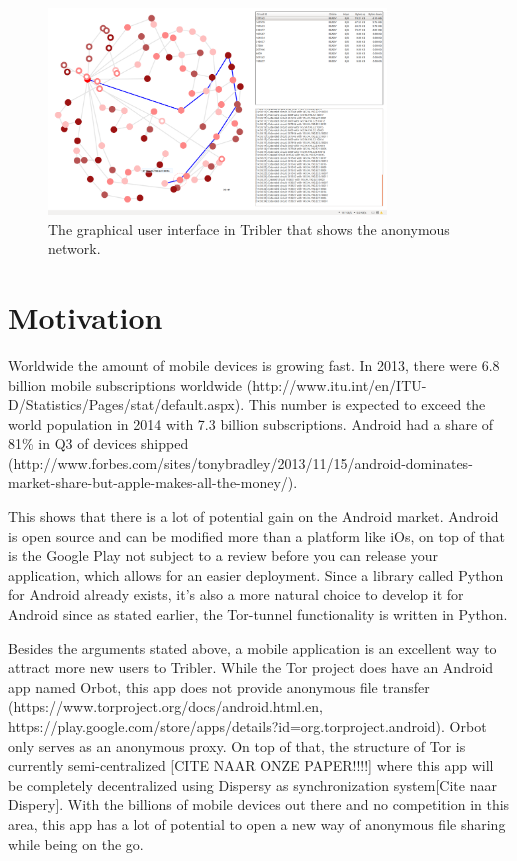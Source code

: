 \documentclass[11pt]{article}
\begin{document}
\begin{figure}[!t]
		\centering
		\includegraphics[width=0.8\textwidth]{graphics/8hop.png}
		\caption{The graphical user interface in Tribler that shows the anonymous network.}
		\label{fig:anon_downloads}
	\end{figure}

\section{Motivation}
Worldwide the amount of mobile devices is growing fast. In 2013, there were 6.8 billion mobile subscriptions worldwide (http://www.itu.int/en/ITU-D/Statistics/Pages/stat/default.aspx). This number is expected to exceed the world population in 2014 with 7.3 billion subscriptions. Android had a share of 81\% in Q3 of devices shipped (http://www.forbes.com/sites/tonybradley/2013/11/15/android-dominates-market-share-but-apple-makes-all-the-money/).

This shows that there is a lot of potential gain on the Android market. Android is open source and can be modified more than a platform like iOs, on top of that is the Google Play not subject to a review before you can release your application, which allows for an easier deployment. Since a library called Python for Android already exists, it's also a more natural choice to develop it for Android since as stated earlier, the Tor-tunnel functionality is written in Python.

Besides the arguments stated above, a mobile application is an excellent way to attract more new users to Tribler. While the Tor project does have an Android app named Orbot, this app does not provide anonymous file transfer (https://www.torproject.org/docs/android.html.en, https://play.google.com/store/apps/details?id=org.torproject.android). Orbot only serves as an anonymous proxy. On top of that, the structure of Tor is currently semi-centralized [CITE NAAR ONZE PAPER!!!!] where this app will be completely decentralized using Dispersy as synchronization system[Cite naar Dispery]. With the billions of mobile devices out there and no competition in this area, this app has a lot of potential to open a new way of anonymous file sharing while being on the go.
\end{document}
